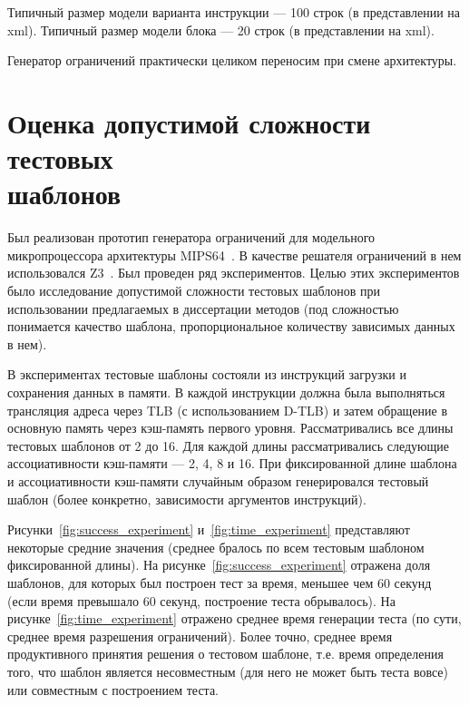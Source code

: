 Типичный размер модели варианта инструкции --- 100 строк (в представлении на xml). Типичный размер модели блока --- 20 строк (в представлении на xml).

Генератор ограничений практически целиком переносим при смене архитектуры.

\section{Оценка допустимой сложности тестовых\\шаблонов}\label{sec:templates_estimation}


Был реализован прототип генератора ограничений для модельного микропроцессора архитектуры
MIPS64~\cite{mips64II}. В качестве решателя ограничений в нем использовался Z3~\cite{Z3}. Был проведен ряд экспериментов. Целью этих экспериментов было исследование допустимой сложности тестовых шаблонов при использовании предлагаемых в диссертации методов (под сложностью понимается
качество шаблона, пропорциональное количеству зависимых данных в нем).

В экспериментах тестовые шаблоны состояли из инструкций загрузки и сохранения
данных в памяти. В каждой инструкции должна была выполняться трансляция адреса
через TLB (с использованием D-TLB) и затем обращение в основную память через
кэш-память первого уровня. Рассматривались все длины тестовых шаблонов от 2 до
16. Для каждой длины рассматривались следующие ассоциативности кэш-памяти --- 2,
4, 8 и 16. При фиксированной длине шаблона и ассоциативности кэш-памяти
случайным образом генерировался тестовый шаблон (более конкретно, зависимости
аргументов инструкций).

Рисунки~\ref{fig:success_experiment} и~\ref{fig:time_experiment} представляют
некоторые средние значения (среднее бралось по всем тестовым шаблоном
фиксированной длины). На рисунке~\ref{fig:success_experiment} отражена доля
шаблонов, для которых был построен тест за время, меньшее чем 60 секунд (если
время превышало 60 секунд, построение теста обрывалось). На
рисунке~\ref{fig:time_experiment} отражено среднее время генерации теста (по
сути, среднее время разрешения ограничений). Более точно, среднее время
продуктивного принятия решения о тестовом шаблоне, т.е. время определения того,
что шаблон является несовместным (для него не может быть теста вовсе) или
совместным с построением теста.


